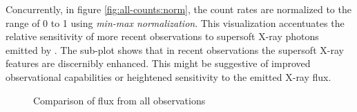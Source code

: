     		Concurrently, in figure \ref{fig:all-counts:norm}, the count rates are normalized to the range of 0 to 1 using \textit{min-max normalization}. This visualization accentuates the relative sensitivity of more recent observations to supersoft X-ray photons emitted by \source. The sub-plot shows that in recent observations the supersoft X-ray features are discernibly enhanced. This might be suggestive of improved observational capabilities or heightened sensitivity to the emitted X-ray flux.
    		
    		\newpage
    		\begin{figure}[h!]
				\centering				
				

				\caption{Comparison of flux from all observations}
		        \label{fig:all-counts}
			\end{figure}
			
		    
